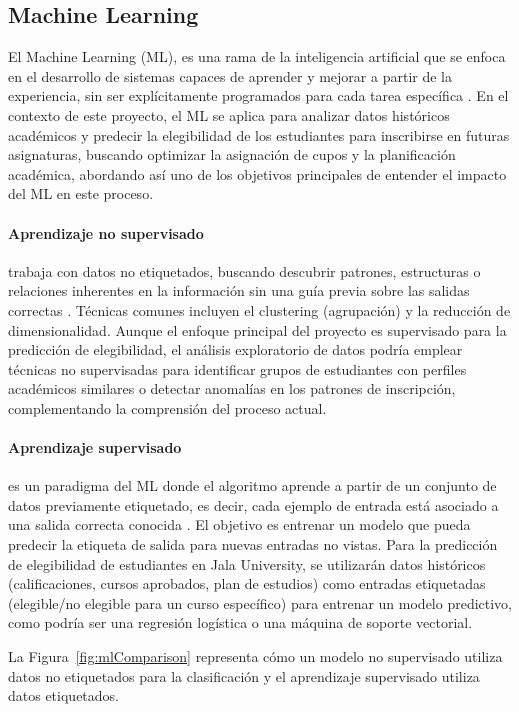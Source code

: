 \subsection{Machine Learning}
El Machine Learning (ML), es una rama de la inteligencia artificial que se enfoca en el desarrollo de sistemas capaces de aprender y mejorar a partir de la experiencia, sin ser explícitamente programados para cada tarea específica \parencite{Samuel1959}.
En el contexto de este proyecto, el ML se aplica para analizar datos históricos académicos y predecir la elegibilidad de los estudiantes para inscribirse en futuras asignaturas, buscando optimizar la asignación de cupos y la planificación académica, abordando así uno de los objetivos principales de entender el impacto del ML en este proceso.

\paragraph{Aprendizaje no supervisado}
trabaja con datos no etiquetados, buscando descubrir patrones, estructuras o relaciones inherentes en la información sin una guía previa sobre las salidas correctas \parencite{Hastie2009}.
Técnicas comunes incluyen el clustering (agrupación) y la reducción de dimensionalidad.
Aunque el enfoque principal del proyecto es supervisado para la predicción de elegibilidad, el análisis exploratorio de datos podría emplear técnicas no supervisadas para identificar grupos de estudiantes con perfiles académicos similares o detectar anomalías en los patrones de inscripción, complementando la comprensión del proceso actual.

\paragraph{Aprendizaje supervisado}
es un paradigma del ML donde el algoritmo aprende a partir de un conjunto de datos previamente etiquetado, es decir, cada ejemplo de entrada está asociado a una salida correcta conocida \parencite{Bishop2006}.
El objetivo es entrenar un modelo que pueda predecir la etiqueta de salida para nuevas entradas no vistas.
Para la predicción de elegibilidad de estudiantes en Jala University, se utilizarán datos históricos (calificaciones, cursos aprobados, plan de estudios) como entradas etiquetadas (elegible/no elegible para un curso específico) para entrenar un modelo predictivo, como podría ser una regresión logística o una máquina de soporte vectorial.

La Figura~\ref{fig:mlComparison} representa cómo un modelo no supervisado utiliza datos no etiquetados para la clasificación y el aprendizaje supervisado utiliza datos etiquetados.

